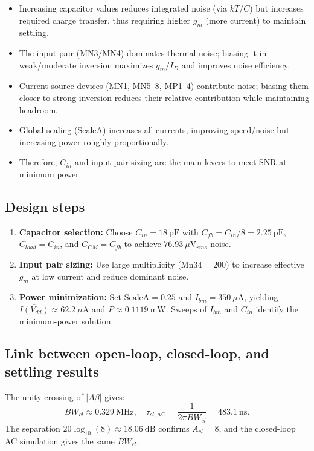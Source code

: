 \documentclass{article}
\begin{document}
\vspace{-2mm}
\begin{itemize}
\setlength{\itemsep}{2pt}
\item Increasing capacitor values reduces integrated noise (via $kT/C$) but increases required charge transfer, thus requiring higher $g_m$ (more current) to maintain settling.
\item The input pair (MN3/MN4) dominates thermal noise; biasing it in weak/moderate inversion maximizes $g_m/I_D$ and improves noise efficiency.
\item Current-source devices (MN1, MN5--8, MP1--4) contribute noise; biasing them closer to strong inversion reduces their relative contribution while maintaining headroom.
\item Global scaling (ScaleA) increases all currents, improving speed/noise but increasing power roughly proportionally.
\item Therefore, $C_{in}$ and input-pair sizing are the main levers to meet SNR at minimum power.
\end{itemize}

\vspace{-2mm}

\subsection{Design steps}
\begin{enumerate}
\setlength{\itemsep}{2pt}
\item \textbf{Capacitor selection:} Choose $C_{in}=18~\mathrm{pF}$ with $C_{fb}=C_{in}/8=2.25~\mathrm{pF}$, $C_{load}=C_{in}$, and $C_{CM}=C_{fb}$ to achieve $76.93~\mu\mathrm{V}_{rms}$ noise.
\item \textbf{Input pair sizing:} Use large multiplicity ($\mathrm{Mn34}=200$) to increase effective $g_m$ at low current and reduce dominant noise.
\item \textbf{Power minimization:} Set $\mathrm{ScaleA}=0.25$ and $I_{bm}=350~\mu\mathrm{A}$, yielding $\overline{I(V_{dd})}\approx 62.2~\mu\mathrm{A}$ and $P\approx 0.1119~\mathrm{mW}$. Sweeps of $I_{bm}$ and $C_{in}$ identify the minimum-power solution.
\end{enumerate}

\vspace{-2mm}

\subsection{Link between open-loop, closed-loop, and settling results}
The unity crossing of $|A\beta|$ gives:
\[
BW_{cl}\approx 0.329~\mathrm{MHz}, \quad
\tau_{cl,\mathrm{AC}}=\frac{1}{2\pi BW_{cl}}=483.1~\mathrm{ns}.
\]
The separation $20\log_{10}(8)\approx 18.06~\mathrm{dB}$ confirms $A_{cl}=8$, and the closed-loop AC simulation gives the same $BW_{cl}$.
\end{document}
